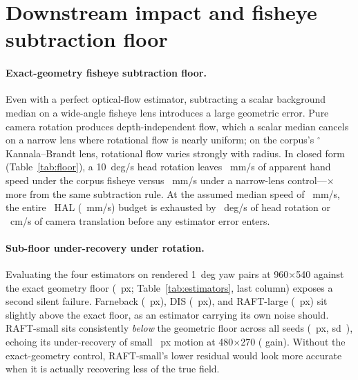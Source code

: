 \documentclass[11pt]{article}
\begin{document}
\section{Downstream impact and fisheye subtraction floor}
\label{sec:impact}

\paragraph{Exact-geometry fisheye subtraction floor.}
Even with a perfect optical-flow estimator, subtracting a scalar background median on a wide-angle
fisheye lens introduces a large geometric error. Pure camera rotation produces depth-independent
flow, which a scalar median cancels on a narrow lens where rotational flow is nearly uniform; on
the corpus's \cgHalfAngle{}$^\circ$ Kannala--Brandt lens, rotational flow varies strongly with
radius. In closed form (Table~\ref{tab:floor}), a 10~deg/s head rotation leaves \cgRotFisheye{}~mm/s
of apparent hand speed under the corpus fisheye versus \cgRotNarrow{}~mm/s under a narrow-lens
control---\cgRotRatio{}$\times$ more from the same subtraction rule. At the assumed median speed of
\cgAssumedMedian{}~mm/s, the entire \cgHalBound{}~HAL (\cgBudgetMmS{}~mm/s) budget is exhausted by
\cgRotBudget{}~deg/s of head rotation or \cgTransBudgetCm{}~cm/s of camera translation before any
estimator error enters.

\begin{table}[t]
\centering\small

\caption{Exact-geometry apparent speed of a static hand after scalar-median ego-motion subtraction
(no optical-flow estimator in the loop), from \texttt{results/a14\_translation\_floor.json}.}
\label{tab:floor}
\end{table}

\paragraph{Sub-floor under-recovery under rotation.}
Evaluating the four estimators on rendered 1~deg yaw pairs at 960$\times$540 against the exact
geometry floor (\cgAOneFourGeom{}~px; Table~\ref{tab:estimators}, last column) exposes a second
silent failure. Farneback (\cgAOneFourFar{}~px), DIS (\cgAOneFourDis{}~px), and RAFT-large
(\cgAOneFourRaftL{}~px) sit slightly above the exact floor, as an estimator carrying its own noise
should. RAFT-small sits consistently \emph{below} the geometric floor across all \cgNSeedsRaft{}
seeds (\cgAOneFourRaftS{}~px, sd~\cgAOneFourRaftSSd{}), echoing its under-recovery of small
\cgRaftSmallPx{}~px motion at 480$\times$270 (\cgRaftSmall{} gain). Without the exact-geometry control,
RAFT-small's lower residual would look more accurate when it is actually recovering less of the
true field.
\end{document}
